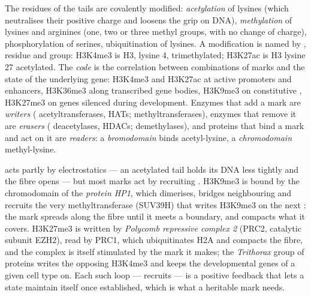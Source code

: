 \begin{definition}\label{def:b3:chromatin-epigenetics:histone-code}
The residues of the  tails are covalently modified:
\emph{acetylation} of lysines (which neutralises their positive charge
and loosens the grip on DNA), \emph{methylation} of lysines and
arginines (one, two or three methyl groups, with no change of charge),
phosphorylation of serines, ubiquitination of lysines. A modification is
named by , residue and group: H3K4me3 is  H3, lysine 4,
trimethylated; H3K27ac is H3 lysine 27 acetylated. The \emph{
code} is the correlation between combinations of marks and the state
of the underlying gene: H3K4me3 and H3K27ac at active promoters and
enhancers, H3K36me3 along transcribed gene bodies, H3K9me3 on
constitutive , H3K27me3 on genes silenced during
development. Enzymes that add a mark are \emph{writers} (
acetyltransferases, HATs; methyltransferases), enzymes that remove it
are \emph{erasers} ( deacetylases, HDACs; demethylases), and
proteins that bind a mark and act on it are \emph{readers}: a
\emph{bromodomain} binds acetyl-lysine, a \emph{chromodomain}
methyl-lysine.
\end{definition}

\begin{proposition}\label{prop:b3:chromatin-epigenetics:readers}
 acts partly by electrostatics --- an acetylated tail holds
its DNA less tightly and the fibre opens --- but most marks act by
recruiting . H3K9me3 is bound by the chromodomain of the
\emph{ protein HP1}, which dimerises, bridges
neighbouring  and recruits the very methyltransferase
(SUV39H) that writes H3K9me3 on the next : the mark spreads
along the fibre until it meets a boundary, and compacts what it
covers. H3K27me3 is written by \emph{Polycomb repressive complex 2}
(PRC2, catalytic subunit EZH2), read by PRC1, which ubiquitinates H2A
and compacts the fibre, and the complex is itself stimulated by the
mark it makes; the \emph{Trithorax} group of proteins writes the
opposing H3K4me3 and keeps the developmental genes of a given cell type
on. Each such loop ---  recruits  --- is a positive feedback
that lets a state maintain itself once established, which is what a
heritable mark needs.
\end{proposition}

